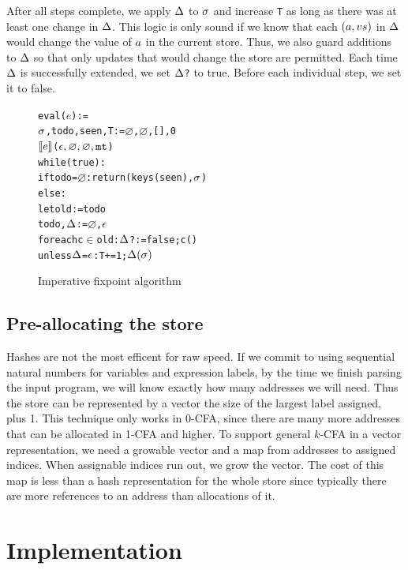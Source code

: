 \documentclass[preprint,onecolumn,9pt]{sigplanconf} %
\begin{document}
After all steps complete, we apply $\Delta$ to $\sigma$ and increase
{\tt T} as long as there was at least one change in $\Delta$. This
logic is only sound if we know that each $(a, v{s})$
in $\Delta$ would change the value of $a$ in the current
store. Thus, we also guard additions to $\Delta$ so that only updates
that would change the store are permitted. Each time $\Delta$ is
successfully extended, we set {\tt $\Delta$?} to true. Before each
individual step, we set it to false.

\begin{figure}
\begin{alltt}
eval(\(e\)) :=
  \(\msto\), todo, seen, T := \(\varnothing\), \(\varnothing\), [], 0
  \(\compile{e}\)(\(\mtcntr, \varnothing, \varnothing, \kmt\))
  while(true):
    if todo = \(\varnothing\): return (keys(seen), \(\msto\))
    else:
      let old := todo
      todo, \(\msdiff\) := \(\varnothing\), \(\mtlst\)
      foreach c \(\in\) old: \(\msdiff\)? := false; c()
      unless \(\msdiff\) = \(\mtlst\): T += 1; \(\msdiff(\msto)\)
\end{alltt}
\caption{Imperative fixpoint algorithm}
\label{fig:imperative}
\end{figure}

\subsection{Pre-allocating the store}
Hashes are not the most efficent for raw speed. If we commit to using
sequential natural numbers for variables and expression labels, by the
time we finish parsing the input program, we will know exactly how
many addresses we will need. Thus the store can be represented by a
vector the size of the largest label assigned, plus 1. This technique
only works in 0-CFA, since there are many more addresses that can be
allocated in 1-CFA and higher. To support general $k$-CFA in a vector
representation, we need a growable vector and a map from addresses to
assigned indices. When assignable indices run out, we grow the
vector. The cost of this map is less than a hash representation for
the whole store since typically there are more references to an address
than allocations of it.

\section{Implementation}
\label{sec:impl}
\end{document}
